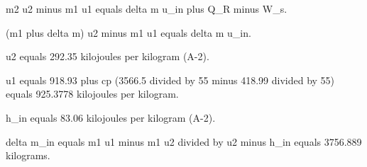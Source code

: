 m2 u2 minus m1 u1 equals delta m u_in plus Q_R minus W_s.  

(m1 plus delta m) u2 minus m1 u1 equals delta m u_in.  

u2 equals 292.35 kilojoules per kilogram (A-2).  

u1 equals 918.93 plus cp (3566.5 divided by 55 minus 418.99 divided by 55) equals 925.3778 kilojoules per kilogram.  

h_in equals 83.06 kilojoules per kilogram (A-2).  

delta m_in equals m1 u1 minus m1 u2 divided by u2 minus h_in equals 3756.889 kilograms.